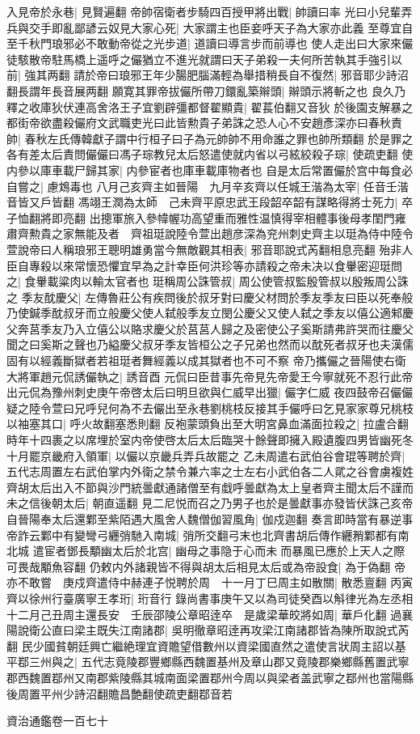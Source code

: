 入見帝於永巷|{
	見賢遍翻}
帝帥宿衛者步騎四百授甲將出戰|{
	帥讀曰率}
光曰小兒輩弄兵與交手即亂鄙諺云奴見大家心死|{
	大家謂主也臣妾呼天子為大家亦此義}
至尊宜自至千秋門琅邪必不敢動帝從之光步道|{
	道讀曰導言步而前導也}
使人走出曰大家來儼徒駭散帝駐馬橋上遥呼之儼猶立不進光就謂曰天子弟殺一夫何所苦執其手強引以前|{
	強其两翻}
請於帝曰琅邪王年少腸肥腦滿輕為舉措稍長自不復然|{
	邪音耶少詩沼翻長謂年長音展两翻}
願寛其罪帝拔儼所帶刀鐶亂築辮頭|{
	辮頭示將斬之也}
良久乃釋之收庫狄伏連高舍洛王子宜劉辟彊都督翟顯貴|{
	翟萇伯翻又音狄}
於後園支解暴之都街帝欲盡殺儼府文武職吏光曰此皆勲貴子弟誅之恐人心不安趙彥深亦曰春秋責帥|{
	春秋左氏傳韓獻子謂中行桓子曰子為元帥帥不用命誰之罪也帥所類翻}
於是罪之各有差太后責問儼儼曰馮子琮教兒太后怒遣使就内省以弓絃絞殺子琮|{
	使疏吏翻}
使内參以庫車載尸歸其家|{
	内參宦者也庫車載庫物者也}
自是太后常置儼於宫中每食必自嘗之|{
	慮鴆毒也}
八月己亥齊主如晉陽　九月辛亥齊以任城王湝為太宰|{
	任音壬湝音皆又戶皆翻}
馮翊王潤為太師　己未齊平原忠武王段韶卒韶有謀略得將士死力|{
	卒子恤翻將即亮翻}
出摠軍旅入參幃幄功高望重而雅性温慎得宰相體事後母孝閨門雍肅齊勲貴之家無能及者　齊祖珽說陸令萱出趙彦深為兖州刺史齊主以珽為侍中陸令萱說帝曰人稱琅邪王聰明雄勇當今無敵觀其相表|{
	邪音耶說式芮翻相息亮翻}
殆非人臣自專殺以來常懷恐懼宜早為之計幸臣何洪珍等亦請殺之帝未决以食轝密迎珽問之|{
	食轝載粱肉以輸太官者也}
珽稱周公誅管叔|{
	周公使管叔監殷管叔以殷叛周公誅之}
季友酖慶父|{
	左傳魯莊公有疾問後於叔牙對曰慶父材問於季友季友曰臣以死奉般乃使鍼季酖叔牙而立般慶父使人弑般季友立閔公慶父又使人弑之季友以僖公適邾慶父奔莒季友乃入立僖公以賂求慶父於莒莒人歸之及密使公子奚斯請弗許哭而往慶父聞之曰奚斯之聲也乃縊慶父叔牙季友皆桓公之子兄弟也然而以酖死者叔牙也夫漢儒固有以經義斷獄者若祖珽者舞經義以成其獄者也不可不察}
帝乃攜儼之晉陽使右衛大將軍趙元侃誘儼執之|{
	誘音酉}
元侃曰臣昔事先帝見先帝愛王今寧就死不忍行此帝出元侃為豫州刺史庚午帝啓太后曰明旦欲與仁威早出獵|{
	儼字仁威}
夜四鼓帝召儼儼疑之陸令萱曰兄呼兒何為不去儼出至永巷劉桃枝反接其手儼呼曰乞見家家尊兄桃枝以袖塞其口|{
	呼火故翻塞悉則翻}
反袍蒙頭負出至大明宮鼻血滿面拉殺之|{
	拉盧合翻}
時年十四裹之以席埋於室内帝使啓太后太后臨哭十餘聲即擁入殿遺腹四男皆幽死冬十月罷京畿府入領軍|{
	以儼以京畿兵弄兵故罷之}
乙未周遣右武伯谷會琨等聘於齊|{
	五代志周置左右武伯掌内外衛之禁令兼六率之士左右小武伯各二人貮之谷會虜複姓}
齊胡太后出入不節與沙門統曇獻通諸僧至有戱呼曇獻為太上皇者齊主聞太后不謹而未之信後朝太后|{
	朝直遥翻}
見二尼悦而召之乃男子也於是曇獻事亦發皆伏誅己亥帝自晉陽奉太后還鄴至紫陌遇大風舍人魏僧伽習風角|{
	伽戍迦翻}
奏言即時當有暴逆事帝詐云鄴中有變彎弓纒弰馳入南城|{
	弰所交翻弓末也北齊書胡后傳作纒矟鄴都有南北城}
遣宦者鄧長顒幽太后於北宫|{
	幽母之事隐于心而未而暴風已應於上天人之際可畏哉顒魚容翻}
仍敕内外諸親皆不得與胡太后相見太后或為帝設食|{
	為于偽翻}
帝亦不敢嘗　庚戍齊遣侍中赫連子悦聘於周　十一月丁巳周主如散關|{
	散悉亶翻}
丙寅齊以徐州行臺廣寧王孝珩|{
	珩音行}
錄尚書事庚午又以為司徒癸酉以斛律光為左丞相　十二月己丑周主還長安　壬辰邵陵公章昭逹卒　是歲梁華皎將如周|{
	華戶化翻}
過襄陽說衛公直曰梁主既失江南諸郡|{
	吳明徹章昭逹再攻梁江南諸郡皆為陳所取說式芮翻}
民少國貧朝廷興亡繼絶理宜資贍望借數州以資梁國直然之遣使言狀周主詔以基平鄀三州與之|{
	五代志竟陵郡豐鄉縣西魏置基州及章山郡又竟陵郡樂鄉縣舊置武寧郡西魏置鄀州又南郡紫陵縣其城南面梁置鄀州今周以與梁者盖武寧之鄀州也當陽縣後周置平州少詩沼翻贍昌艶翻使疏吏翻鄀音若}


資治通鑑卷一百七十
